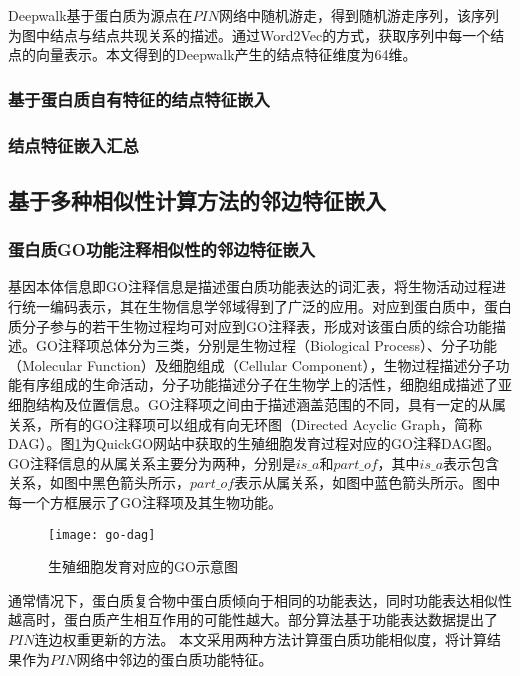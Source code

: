 Deepwalk基于蛋白质为源点在$PIN$网络中随机游走，得到随机游走序列，该序列为图中结点与结点共现关系的描述。通过Word2Vec的方式，获取序列中每一个结点的向量表示。本文得到的Deepwalk产生的结点特征维度为64维。
\subsubsection{基于蛋白质自有特征的结点特征嵌入}

\subsubsection{结点特征嵌入汇总}

\subsection{基于多种相似性计算方法的邻边特征嵌入}
\label{subsection:featPPINetwork:edgeFeatConstruct}


\subsubsection{蛋白质GO功能注释相似性的邻边特征嵌入}

基因本体信息\cite{ashburner_gene_2000}即GO注释信息是描述蛋白质功能表达的词汇表，将生物活动过程进行统一编码表示，其在生物信息学邻域得到了广泛的应用。对应到蛋白质中，蛋白质分子参与的若干生物过程均可对应到GO注释表，形成对该蛋白质的综合功能描述。GO注释项总体分为三类，分别是生物过程（Biological Process）、分子功能（Molecular Function）及细胞组成（Cellular Component），生物过程描述分子功能有序组成的生命活动，分子功能描述分子在生物学上的活性，细胞组成描述了亚细胞结构及位置信息。GO注释项之间由于描述涵盖范围的不同，具有一定的从属关系，所有的GO注释项可以组成有向无环图（Directed Acyclic Graph，简称DAG）。图\ref{fig:go-dag}为QuickGO\cite{binns_quickgo_2009}网站中获取的生殖细胞发育过程对应的GO注释DAG图。GO注释信息的从属关系主要分为两种，分别是$is\_a$和$part\_of$，其中$is\_a$表示包含关系，如图中黑色箭头所示，$part\_of$表示从属关系，如图中蓝色箭头所示。图中每一个方框展示了GO注释项及其生物功能。
\begin{figure}[htbp]
    \centering
    \texttt{[image: go-dag]}
    \caption{生殖细胞发育对应的GO示意图}
    \label{fig:go-dag}
\end{figure}

通常情况下，蛋白质复合物中蛋白质倾向于相同的功能表达，同时功能表达相似性越高时，蛋白质产生相互作用的可能性越大。部分算法\cite{ulitsky_identification_2007,jianxing_feng_max-flow-based_2011}基于功能表达数据提出了$PIN$连边权重更新的方法。
本文采用两种方法计算蛋白质功能相似度，将计算结果作为$PIN$网络中邻边的蛋白质功能特征。

